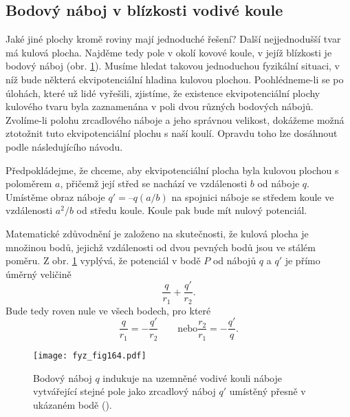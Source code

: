   \subsection{Bodový náboj v blízkosti vodivé koule}  %
    Jaké jiné plochy kromě roviny mají jednoduché řešení? Další nejjednodušší tvar má kulová 
    plocha. Najděme tedy pole v okolí kovové koule, v jejíž blízkosti je bodový náboj (obr. 
    \ref{fyz:fig164}). Musíme hledat takovou jednoduchou fyzikální situaci, v níž bude některá 
    ekvipotenciální hladina kulovou plochou. Poohlédneme-li se po úlohách, které už lidé vyřešili, 
    zjistíme, že existence ekvipotenciální plochy kulového tvaru byla zaznamenána v poli dvou 
    různých bodových nábojů. Zvolíme-li polohu zrcadlového náboje a jeho správnou velikost, 
    dokážeme možná ztotožnit tuto ekvipotenciální plochu s naší koulí. Opravdu toho lze dosáhnout 
    podle následujícího návodu.
    
    Předpokládejme, že chceme, aby ekvipotenciální plocha byla kulovou plochou s poloměrem \(a\), 
    přičemž její střed se nachází ve vzdálenosti \(b\) od náboje \(q\). Umístěme obraz náboje \(q' 
    = –q(a/b)\) na spojnici náboje se středem koule ve vzdálenosti \(a^2/b\) od středu koule. Koule 
    pak bude mít nulový potenciál.
    
    Matematické zdůvodnění je založeno na skutečnosti, že kulová plocha je množinou bodů, jejichž 
    vzdálenosti od dvou pevných bodů jsou ve stálém poměru. Z obr. \ref{fyz:fig164} vyplývá, že 
    potenciál v bodě \(P\) od nábojů \(q\) a \(q'\) je přímo úměrný veličině
    \begin{equation*}
      \dfrac{q}{r_1} + \dfrac{q'}{r_2}.
    \end{equation*}
    Bude tedy roven nule ve všech bodech, pro které
    \begin{equation*}
      \dfrac{q}{r_1} = -\dfrac{q'}{r_2} \qquad\text{nebo} \dfrac{r_2}{r_1} = -\dfrac{q'}{q}.
    \end{equation*}
    
    \begin{figure}[ht!]  %
      \centering
      \texttt{[image: fyz\_fig164.pdf]}
      \caption{Bodový náboj \(q\) indukuje na uzemněné vodivé kouli náboje vytvářející stejné pole 
               jako zrcadlový náboj \(q'\) umístěný přesně v ukázaném bodě 
               (\cite[s.~113]{Feynman02}).}
      \label{fyz:fig164}
    \end{figure}
    
